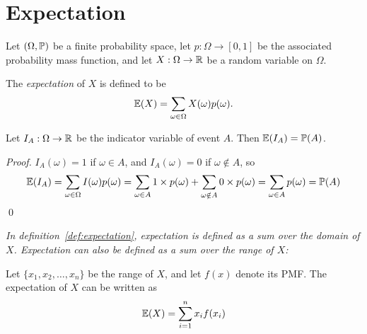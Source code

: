 \section{Expectation}
Let $(\Omega,\mathbb{P})$ be a finite probability space, let $p:\Omega\to[0,1]$ be the associated probability mass function, and let $X:\Omega\to\mathbb{R}$ be a random variable on $\Omega$. 

\begin{definition}\label{def:expectation}
The \emph{expectation} of $X$ is defined to be
\[
\mathbb{E}(X) = \sum_{\omega\in\Omega} X(\omega)p(\omega).
\]
\end{definition}

\begin{theorem}
Let $I_A:\Omega\to\mathbb{R}$ be the indicator variable of event $A$. Then $\mathbb{E}(I_A) = \mathbb{P}(A)$.
\end{theorem}

\begin{proof}
$I_A(\omega)=1$ if $\omega\in A$, and $I_A(\omega)=0$ if $\omega\notin A$, so
\[
\mathbb{E}(I_A) 
	= \sum_{\omega\in\Omega} I(\omega)p(\omega) 
	= \sum_{\omega\in A} 1\times p(\omega) + \sum_{\omega\notin A} 0\times p(\omega) 
	= \sum_{\omega\in A} p(\omega) 
	= \mathbb{P}(A)
\]
\qed
\end{proof}


\bit
\it In definition~\ref{def:expectation}, expectation is defined as a sum over the \emph{domain} of $X$.
\it Expectation can also be defined as a sum over the \emph{range} of $X$:
\eit

\begin{theorem}\label{thm:expe_pmf}
Let $\{x_1,x_2,\ldots,x_n\}$ be the range of $X$, and let $f(x)$ denote its PMF. The expectation of $X$ can be written as 
\[
\mathbb{E}(X) = \sum_{i=1}^n x_i f(x_i) 
\]
\end{theorem}

